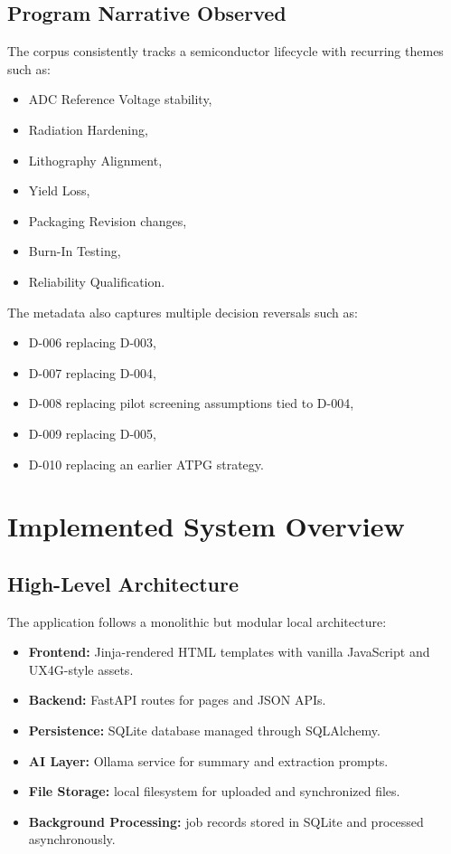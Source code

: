 \documentclass[12pt, a4paper]{article}
\begin{document}
\subsection{Program Narrative Observed}
The corpus consistently tracks a semiconductor lifecycle with recurring themes such as:
\begin{itemize}
\item ADC Reference Voltage stability,
\item Radiation Hardening,
\item Lithography Alignment,
\item Yield Loss,
\item Packaging Revision changes,
\item Burn-In Testing,
\item Reliability Qualification.
\end{itemize}

The metadata also captures multiple decision reversals such as:
\begin{itemize}
\item D-006 replacing D-003,
\item D-007 replacing D-004,
\item D-008 replacing pilot screening assumptions tied to D-004,
\item D-009 replacing D-005,
\item D-010 replacing an earlier ATPG strategy.
\end{itemize}

\section{Implemented System Overview}
\subsection{High-Level Architecture}
The application follows a monolithic but modular local architecture:
\begin{itemize}
\item \textbf{Frontend:} Jinja-rendered HTML templates with vanilla JavaScript and UX4G-style assets.
\item \textbf{Backend:} FastAPI routes for pages and JSON APIs.
\item \textbf{Persistence:} SQLite database managed through SQLAlchemy.
\item \textbf{AI Layer:} Ollama service for summary and extraction prompts.
\item \textbf{File Storage:} local filesystem for uploaded and synchronized files.
\item \textbf{Background Processing:} job records stored in SQLite and processed asynchronously.
\end{itemize}
\end{document}
